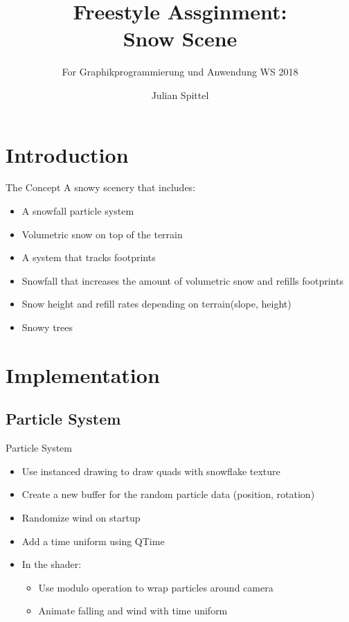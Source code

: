 \documentclass[18pt]{beamer}
\title[Snow Scene]{Freestyle Assginment:\\ Snow Scene}
\subtitle{For Graphikprogrammierung und Anwendung WS 2018}
\author{Julian Spittel}
\institute{Computer Graphics Group}
\begin{document}

\begin{frame}
\titlepage
\end{frame}

\section{Introduction}
\begin{frame}{The Concept}
A snowy scenery that includes:
\begin{itemize}
\item A snowfall particle system
\item Volumetric snow on top of the terrain
\item A system that tracks footprints
\item Snowfall that increases the amount of volumetric snow and refills footprints
\item Snow height and refill rates depending on terrain(slope, height)
\item Snowy trees
\end{itemize}
\end{frame}

\section{Implementation}


\subsection{Particle System}
\begin{frame}{Particle System}
\begin{itemize}
\item Use instanced drawing to draw quads with snowflake texture
\item Create a new buffer for the random particle data (position, rotation)
\item Randomize wind on startup
\item Add a time uniform using QTime
\item In the shader:
\begin{itemize}
	\item Use modulo operation to wrap particles around camera
	\item Animate falling and wind with time uniform
\end{itemize}

\end{itemize}
\end{frame}
\end{document}
